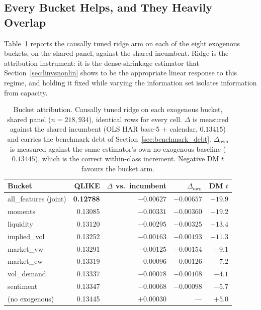 \subsection{Every Bucket Helps, and They Heavily Overlap}
\label{sec:buckets}

Table~\ref{tab:buckets} reports the causally tuned ridge arm on each of the
eight exogenous buckets, on the shared panel, against the shared incumbent.
Ridge is the attribution instrument: it is the dense-shrinkage estimator that
Section~\ref{sec:linvsnonlin} shows to be the appropriate linear response to
this regime, and holding it fixed while varying the information set isolates
information from capacity.

\begin{table}[H]
\centering
\caption{Bucket attribution. Causally tuned ridge on each exogenous bucket,
shared panel ($n = 218{,}934$), identical rows for every cell. $\Delta$ is
measured against the shared incumbent (OLS HAR base-5 $+$ calendar,
$0.13415$) and carries the benchmark debt of Section~\ref{sec:benchmark_debt}.
$\Delta_{\text{own}}$ is measured against the same estimator's own no-exogenous
baseline ($0.13445$), which is the correct within-class increment. Negative DM
$t$ favours the bucket arm.}
\label{tab:buckets}
\begin{tabular}{lrrrr}
\toprule
Bucket & QLIKE & $\Delta$ vs.\ incumbent & $\Delta_{\text{own}}$ & DM $t$ \\
\midrule
all\_features (joint) & \textbf{0.12788} & $-0.00627$ & $-0.00657$ & $-19.9$ \\
\midrule
moments          & 0.13085 & $-0.00331$ & $-0.00360$ & $-19.2$ \\
liquidity        & 0.13120 & $-0.00295$ & $-0.00325$ & $-13.4$ \\
implied\_vol     & 0.13252 & $-0.00163$ & $-0.00193$ & $-11.3$ \\
market\_vw       & 0.13291 & $-0.00125$ & $-0.00154$ & $-9.1$ \\
market\_ew       & 0.13319 & $-0.00096$ & $-0.00126$ & $-7.2$ \\
vol\_demand      & 0.13337 & $-0.00078$ & $-0.00108$ & $-4.1$ \\
sentiment        & 0.13347 & $-0.00068$ & $-0.00098$ & $-5.7$ \\
\midrule
(no exogenous)   & 0.13445 & $+0.00030$ & --- & $+5.0$ \\
\bottomrule
\end{tabular}
\end{table}

